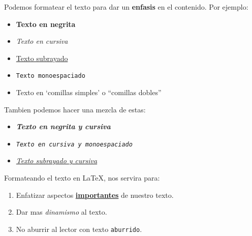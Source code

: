 \documentclass[12pt]{article}
\begin{document}
    \noindent Podemos formatear el texto para dar un \textbf{enfasis} en el
    contenido. Por ejemplo:
    \begin{itemize}
        \item \textbf{Texto en negrita}

        \item \textit{Texto en cursiva}

        \item \underline{Texto subrayado}

        \item \texttt{Texto monoespaciado}

        \item Texto en `comillas simples' o ``comillas dobles''
    \end{itemize}

    \noindent Tambien podemos hacer una mezcla de estas:
    \begin{itemize}
        \item \textbf{\textit{Texto en negrita y cursiva}}

        \item \textit{\texttt{Texto en cursiva y monoespaciado}}

        \item \underline{\textit{Texto subrayado y cursiva}}
    \end{itemize}

    \noindent Formateando el texto en \LaTeX, nos servira para:
    \begin{enumerate}
        \item Enfatizar aspectos \textbf{\underline{importantes}} de nuestro texto.

        \item Dar mas \textit{dinamismo} al texto.

        \item No aburrir al lector con texto \texttt{aburrido}.
    \end{enumerate}
\end{document}
